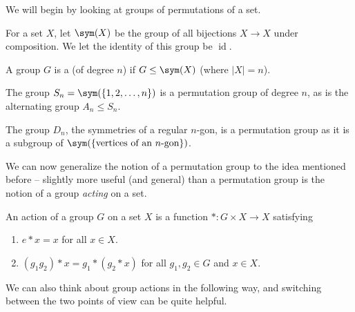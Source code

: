 We will begin by looking at groups of permutations of a set.

\begin{definition}[$\sym(X)$]
	For a set $X$, let $\sym(X)$ be the group of all bijections $X \rightarrow X$ under composition. We let the identity of this group be $\operatorname{id}$.
\end{definition}

\begin{definition}
	A group $G$ is a  (of degree $n$) if $G \leq \sym(X)$ (where $|X| = n$).
\end{definition}

\begin{example}
	The group $S_n = \sym(\{1, 2, \dots, n\})$ is a permutation group of degree $n$, as is the alternating group $A_n \leq S_n$.

	The group $D_n$, the symmetries of a regular $n$-gon, is a permutation group as it is a subgroup of $\sym(\{\text{vertices of an $n$-gon}\})$.
\end{example}

We can now generalize the notion of a permutation group to the idea mentioned before -- slightly more useful (and general) than a permutation group is the notion of a group \emph{acting} on a set.

\begin{definition}
	An action of a group $G$ on a set $X$ is a function $*: G \times X \rightarrow X$ satisfying
	\begin{enumerate}[label=(\roman*)]
		\item $e * x = x$ for all $x \in X$.
		\item $(g_1 g_2) * x = g_1 * (g_2 * x)$ for all $g_1, g_2 \in G$ and $x \in X$.
	\end{enumerate}
\end{definition}

We can also think about group actions in the following way, and switching between the two points of view can be quite helpful.

